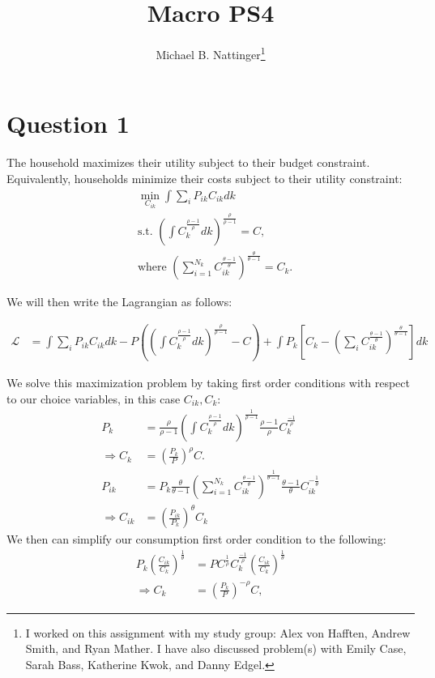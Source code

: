 \documentclass[11pt]{article} %
\title{Macro PS4}
\author{Michael B. Nattinger\footnote{I worked on this assignment with my study group: Alex von Hafften, Andrew Smith, and Ryan Mather. I have also discussed problem(s) with Emily Case, Sarah Bass, Katherine Kwok, and Danny Edgel.}}
\begin{document}
\maketitle
\section{Question 1}
The household maximizes their utility subject to their budget constraint. Equivalently, households minimize their costs subject to their utility constraint:
\begin{align*}
&\min_{C_{ik}} \int \sum_i P_{ik} C_{ik} dk\\
&\text{s.t. } \left( \int C_k^{\frac{\rho - 1}{\rho}} dk \right)^{\frac{\rho}{\rho - 1}} = C,\\
&\text{where } \left( \sum_{i=1}^{N_k} C_{ik}^{\frac{\theta - 1}{\theta}} \right)^{\frac{\theta}{\theta - 1}} = C_k.
\end{align*}

We will then write the Lagrangian as follows:

\begin{align*}
\mathcal{L} &=\int \sum_i P_{ik} C_{ik} dk - P\left(  \left( \int C_k^{\frac{\rho - 1}{\rho}} dk\right)^{\frac{\rho}{\rho - 1}} - C \right) + \int P_k\left[C_k - \left( \sum_i C_{ik}^{\frac{\theta - 1}{\theta}}\right)^{\frac{\theta}{\theta - 1}} \right] dk
\end{align*}

We solve this maximization problem by taking first order conditions with respect to our choice variables, in this case $C_{ik},C_k$:
\begin{align*}
P_{k}  &= \frac{\rho}{\rho - 1} \left( \int C_k^{\frac{\rho - 1}{\rho}} dk \right)^{\frac{1}{\rho - 1}}\frac{\rho - 1}{\rho}C_k^{\frac{-1}{\rho}}\\
\Rightarrow C_k &= \left(\frac{P_k}{P}\right)^{\rho} C. \\
P_{ik} &= P_k  \frac{\theta}{\theta - 1}\left( \sum_{i=1}^{N_k} C_{ik}^{\frac{\theta - 1}{\theta}} \right)^{\frac{1}{\theta - 1}} \frac{\theta - 1}{\theta}C_{ik}^{-\frac{1}{\theta}}\\
\Rightarrow C_{ik} &= \left(\frac{P_{ik}}{P_{k}}\right)^{\theta}C_{k}
\end{align*}
We then can simplify our consumption first order condition to the following:
\begin{align*}
P_k  \left(\frac{C_{ik}}{C_k}\right)^{\frac{1}{\theta}}  &= P C^{\frac{1}{\rho}}C_k^{\frac{-1}{\rho}}\left(\frac{C_{ik}}{C_k}\right)^{\frac{1}{\theta}}\\
\Rightarrow C_k &= \left( \frac{P_k}{P} \right)^{-\rho}C,
\end{align*}
\end{document}
